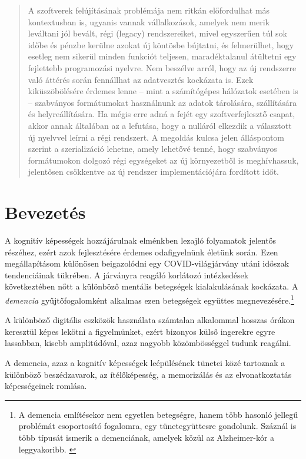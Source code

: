 \documentclass[tocnopagenum]{thesis-ekf}
\begin{document}
\begin{abstract}
		A szoftverek felújításának problémája nem ritkán előfordulhat más kontextusban is, ugyanis vannak vállalkozások, amelyek nem merik leváltani jól bevált, régi (legacy) rendszereiket, mivel egyszerűen túl sok időbe és pénzbe kerülne azokat új köntösbe bújtatni, és felmerülhet, hogy esetleg nem sikerül minden funkciót teljesen, maradéktalanul átültetni egy fejlettebb programozási nyelvre. Nem beszélve arról, hogy az új rendszerre való áttérés során fennállhat az adatvesztés kockázata is. Ezek kiküszöbölésére érdemes lenne -- mint a számítógépes hálózatok esetében is --  szabványos formátumokat használnunk az adatok tárolására, szállítására és helyreállítására. Ha mégis erre adná a fejét egy szoftverfejlesztő csapat, akkor annak általában az a lefutása, hogy a nulláról elkezdik a választott új nyelvvel leírni a régi rendszert. A megoldás kulcsa jelen álláspontom szerint a szerializáció lehetne, amely lehetővé tenné, hogy szabványos formátumokon dolgozó régi egységeket az új környezetből is meghívhassuk, jelentősen csökkentve az új rendszer implementációjára fordított időt.
	\end{abstract}
	\section{Bevezetés}
	A kognitív képességek hozzájárulnak elménkben lezajló folyamatok jelentős részéhez, ezért azok fejlesztésére érdemes odafigyelnünk életünk során. Ezen megállapításom különösen beigazolódni egy COVID-világjárvány utáni időszak tendenciáinak tükrében.
	A járványra reagáló korlátozó intézkedések következtében nőtt a különböző mentális betegségek kialakulásának kockázata. \cite{brain1} 
	A \textit{demencia} gyűjtőfogalomként alkalmas ezen betegségek együttes megnevezésére.\footnote{A demencia említésekor nem egyetlen betegségre, hanem több hasonló jellegű problémát  csoportosító fogalomra, egy tünetegyüttesre gondolunk. Száznál is több típusát ismerik a demenciának, amelyek közül az Alzheimer-kór a leggyakoribb. \cite{demencia_egeszsegvonal}}
	
	A különböző digitális eszközök használata számtalan alkalommal hosszas órákon keresztül képes lekötni a figyelmünket, ezért bizonyos külső ingerekre egyre lassabban, kisebb amplitúdóval, azaz nagyobb közömbösséggel tudunk reagálni. 
	
	A demencia, azaz a kognitív képességek leépülésének tünetei közé tartoznak a különböző beszédzavarok, az ítélőképesség, a memorizálás és az elvonatkoztatás képességeinek romlása.
	
\end{document}
